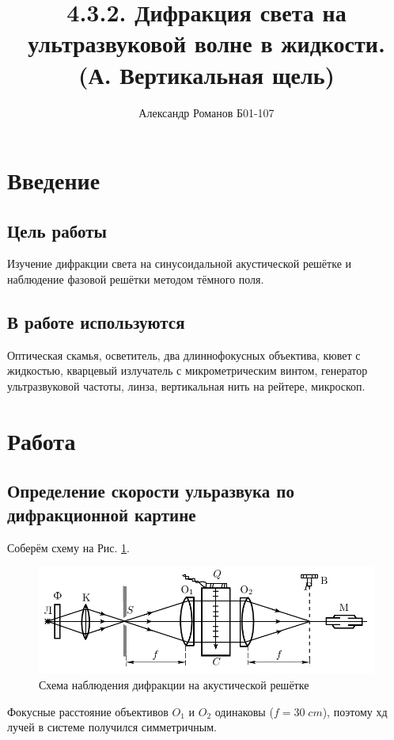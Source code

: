 \documentclass{article}
\author{Александр Романов Б01-107}
\date{}
\title{4.3.2. Дифракция света на ультразвуковой волне в жидкости. (А. Вертикальная щель)}
\begin{document}
\maketitle
\section{Введение}
\subsection{Цель работы}
Изучение дифракции света на синусоидальной акустической решётке и наблюдение фазовой решётки методом
тёмного поля.
\subsection{В работе используются}
Оптическая скамья, осветитель, два длиннофокусных объектива, кювет с жидкостью, кварцевый излучатель с
микрометрическим винтом, генератор ультразвуковой частоты, линза, вертикальная нить на рейтере, микроскоп.
\section{Работа}
\subsection{Определение скорости ульразвука по дифракционной картине}
Соберём схему на Рис. \ref{fig:difr-scheme}.

\begin{figure}[H]
  \centering
  \includegraphics[width=\textwidth]{difr-scheme.png}
  \caption{Схема наблюдения дифракции на акустической решётке}
  \label{fig:difr-scheme}
\end{figure}
Фокусные расстояние объективов \(O_1\) и \(O_2\) одинаковы (\(f = 30\; cm\)), поэтому хд лучей в системе
получился симметричным.
\end{document}
